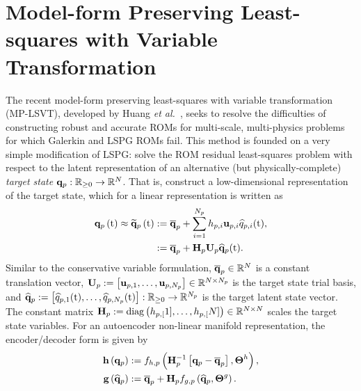 \section{Model-form Preserving Least-squares with Variable Transformation}\label{sec:mplsvt}

The recent model-form preserving least-squares with variable transformation (MP-LSVT), developed by Huang \textit{et al.}~\cite{Huang2022}, seeks to resolve the difficulties of constructing robust and accurate ROMs for multi-scale, multi-physics problems for which Galerkin and LSPG ROMs fail. This method is founded on a very simple modification of LSPG: solve the ROM residual least-squares problem with respect to the latent representation of an alternative (but physically-complete) \textit{target state} $\mathbf{q}_{p}: \mathbb{R}_{\ge 0} \rightarrow \mathbb{R}^{N}$. That is, construct a low-dimensional representation of the target state, which for a linear representation is written as
%
\begin{equation}\label{eq:primSolApprox}
    \begin{aligned}
        \primFunc{\timeVar} \approx \primFuncRom{\timeVar} &\defEq \primVecCent + \sum_{\dummyIdx=1}^{\numPrimModes} \primScaleVar{\dummyIdx} \primTrialVecIdx \primVarCoefIdx (\timeVar), \\
        &\defEq \primAffineMap(\timeVar).
    \end{aligned}
\end{equation}
%
Similar to the conservative variable formulation, $\mathbf{\overline{q}}_{p} \in \mathbb{R}^{N}$ is a constant translation vector, $\primTrial \defEq \left[\primTrialVec{1},\hdots,\primTrialVec{\numPrimModes}\right] \inRTwo{\numDOF}{\numPrimModes}$ is the target state trial basis, and $\mathbf{\widehat{q}}_{p} := \left[\widehat{q}_{p,1}(\text{t}),\hdots,\widehat{q}_{p,N_p}(\text{t})\right]: \mathbb{R}_{\ge 0} \rightarrow \mathbb{R}^{N_p}$ is the target latent state vector. The constant matrix $\primScale \defEq \text{diag}\left(\primScaleVar[1], \hdots , \primScaleVar[\numDOF]\right) \inRTwo{\numDOF}{\numDOF}$ scales the target state variables. For an autoencoder non-linear manifold representation, the encoder/decoder form is given by
%
\begin{align}
    \encoderFunc{\primVec} &\defEq \nnLayer_{\encoderVar,\primVar} \left(\primScaleInv\left[\primVec - \primVecCent\right], \nnParams^{\encoderVar}\right), \\
    \decoderFunc{\primVecCoef} &\defEq \primVecCent + \primScale \nnLayer_{\decoderVar,\primVar} \left(\primVecCoef, \nnParams^{\decoderVar}\right). \label{eq:decoderFuncPrim}
\end{align}
